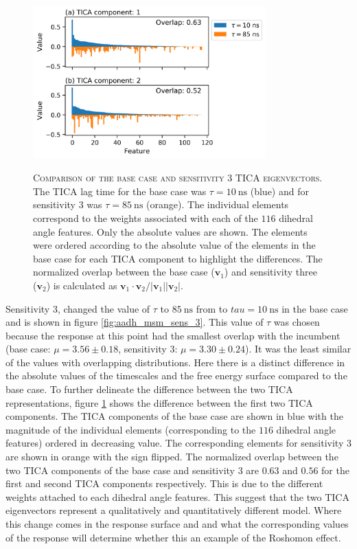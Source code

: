 \begin{figure}
    \centering
    \caption[Comparison of the base case and sensitivity 3 TICA eigenvectors]{\textsc{Comparison of the base case and sensitivity 3 TICA eigenvectors}. The TICA lag time for the base case was $\tau=\SI{10}{\nano\second}$ (blue) and for sensitivity 3 was $\tau=\SI{85}{\nano\second}$ (orange). The individual elements correspond to the weights associated with each of the $116$ dihedral angle features. Only the absolute values are shown. The elements were ordered according to the absolute value of the elements in the base case for each TICA component to highlight the differences. The normalized overlap between the base case ($\mathbf{v}_{1}$) and sensitivity three ($\mathbf{v}_{2}$) is calculated as $\mathbf{v}_{1}\cdot\mathbf{v}_{2}/|\mathbf{v}_{1}||\mathbf{v}_{2}|$.}
    \includegraphics[width=0.8\textwidth]{chapters/msm_optimization/figures/aadh_msm_sens_3_tica.png}
    \label{fig:aadh_msm_sens_3_tica}
\end{figure}

Sensitivity 3, changed the value of $\tau$ to $\SI{85}{\nano\second}$ from to $tau = \SI{10}{\nano\second}$ in the base case and is shown in figure \ref{fig:aadh_msm_sens_3}.   This value of $\tau$ was chosen because the response at this point had the smallest  overlap with the incumbent (base case: $\mu=3.56 \pm 0.18$, sensitivity 3: $\mu=3.30 \pm 0.24$). It was the least similar of the values with overlapping distributions. Here there is a distinct difference in the absolute values of the timescales and the free energy surface compared to the base case. To further delineate the difference between the two TICA representations, figure \ref{fig:aadh_msm_sens_3_tica} shows the difference between the first two TICA components. The  TICA components of the base case are shown in blue with the magnitude of the individual elements (corresponding to the $116$ dihedral angle features) ordered in decreasing value. The corresponding elements for sensitivity 3 are shown in orange with the sign flipped. The normalized overlap between the two TICA components of the base case and sensitivity 3 are $0.63$ and $0.56$  for the first and second TICA components respectively. This is due to the different weights attached to each dihedral angle features. This suggest that the two TICA eigenvectors represent a qualitatively and quantitatively different model. Where this change comes in the response surface and and what the corresponding values of the response will determine whether this an example of the Roshomon effect. 


